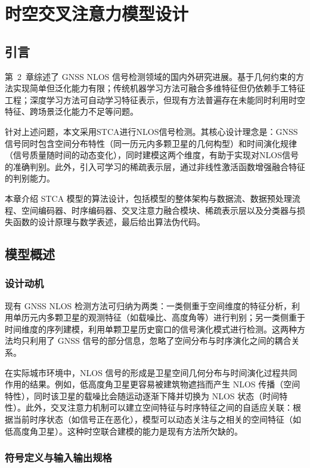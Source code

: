 \chapter{时空交叉注意力模型设计}

\section{引言}

    第~2~章综述了 GNSS NLOS 信号检测领域的国内外研究进展。基于几何约束的方法实现简单但泛化能力有限；传统机器学习方法可融合多维特征但仍依赖手工特征工程；深度学习方法可自动学习特征表示，但现有方法普遍存在未能同时利用时空特征、跨场景泛化能力不足等问题。

    针对上述问题，本文采用STCA进行NLOS信号检测。其核心设计理念是：GNSS信号同时包含空间分布特性（同一历元内多颗卫星的几何构型）和时间演化规律（信号质量随时间的动态变化），同时建模这两个维度，有助于实现对NLOS信号的准确判别。此外，引入可学习的稀疏表示层，通过非线性激活函数增强融合特征的判别能力。

    本章介绍 STCA 模型的算法设计，包括模型的整体架构与数据流、数据预处理流程、空间编码器、时序编码器、交叉注意力融合模块、稀疏表示层以及分类器与损失函数的设计原理与数学表述，最后给出算法伪代码。

\section{模型概述}

\subsection{设计动机}

    现有 GNSS NLOS 检测方法可归纳为两类：一类侧重于空间维度的特征分析，利用单历元内多颗卫星的观测特征（如载噪比、高度角等）进行判别；另一类侧重于时间维度的序列建模，利用单颗卫星历史窗口的信号演化模式进行检测。这两种方法均只利用了 GNSS 信号的部分信息，忽略了空间分布与时序演化之间的耦合关系。

    在实际城市环境中，NLOS 信号的形成是卫星空间几何分布与时间演化过程共同作用的结果。例如，低高度角卫星更容易被建筑物遮挡而产生 NLOS 传播（空间特性），同时该卫星的载噪比会随运动逐渐下降并切换为 NLOS 状态（时间特性）。此外，交叉注意力机制可以建立空间特征与时序特征之间的自适应关联：根据当前时序状态（如信号正在恶化），模型可以动态关注与之相关的空间特征（如低高度角卫星）。这种时空联合建模的能力是现有方法所欠缺的。

    \subsection{符号定义与输入输出规格}


